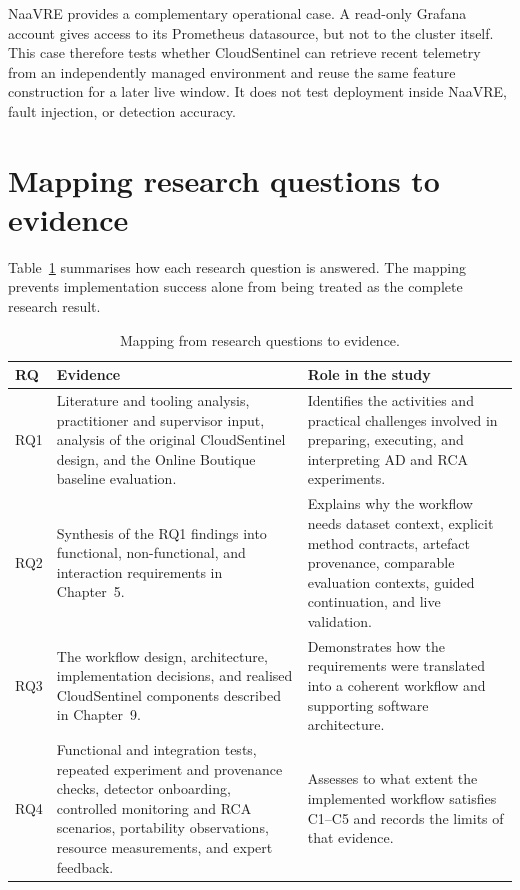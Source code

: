 NaaVRE provides a complementary operational case. A read-only Grafana account gives access to its Prometheus datasource, but not to the cluster itself. This case therefore tests whether CloudSentinel can retrieve recent telemetry from an independently managed environment and reuse the same feature construction for a later live window. It does not test deployment inside NaaVRE, fault injection, or detection accuracy.

\section{Mapping research questions to evidence}
Table~\ref{tab:rq_evidence_mapping} summarises how each research question is answered. The mapping prevents implementation success alone from being treated as the complete research result.

\begin{table}[H]
    \centering
    \caption{Mapping from research questions to evidence.}
    \label{tab:rq_evidence_mapping}
    \small
    \begin{tabular}{@{}p{} p{} p{}@{}}
        \toprule
        \textbf{RQ} & \textbf{Evidence} & \textbf{Role in the study} \\
        \midrule
        RQ1 & Literature and tooling analysis, practitioner and supervisor input, analysis of the original CloudSentinel design, and the Online Boutique baseline evaluation. & Identifies the activities and practical challenges involved in preparing, executing, and interpreting AD and RCA experiments. \\
        RQ2 & Synthesis of the RQ1 findings into functional, non-functional, and interaction requirements in Chapter~5. & Explains why the workflow needs dataset context, explicit method contracts, artefact provenance, comparable evaluation contexts, guided continuation, and live validation. \\
        RQ3 & The workflow design, architecture, implementation decisions, and realised CloudSentinel components described in Chapter~9. & Demonstrates how the requirements were translated into a coherent workflow and supporting software architecture. \\
        RQ4 & Functional and integration tests, repeated experiment and provenance checks, detector onboarding, controlled monitoring and RCA scenarios, portability observations, resource measurements, and expert feedback. & Assesses to what extent the implemented workflow satisfies C1--C5 and records the limits of that evidence. \\
        \bottomrule
    \end{tabular}
\end{table}

